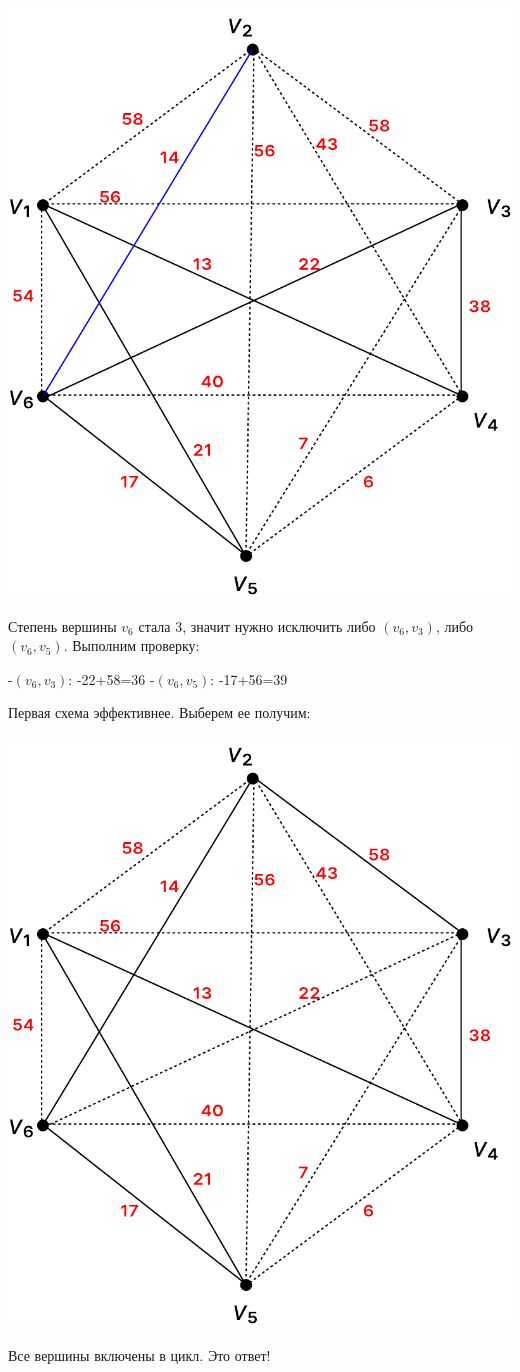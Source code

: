 \documentclass[12pt]{article}
\begin{document}
\begin{center}
\includegraphics[scale=.6]{19_7.pdf}
\end{center}

Степень вершины $v_6$ стала 3, значит нужно исключить либо
$(v_6, v_3)$, либо $(v_6, v_5)$. Выполним проверку:

-$(v_6, v_3)$: -22+58=36
-$(v_6, v_5)$: -17+56=39

Первая схема эффективнее. Выберем ее получим:

\begin{center}
\includegraphics[scale=.6]{19_8.pdf}
\end{center}

Все вершины включены в цикл. Это ответ!
\end{document}
